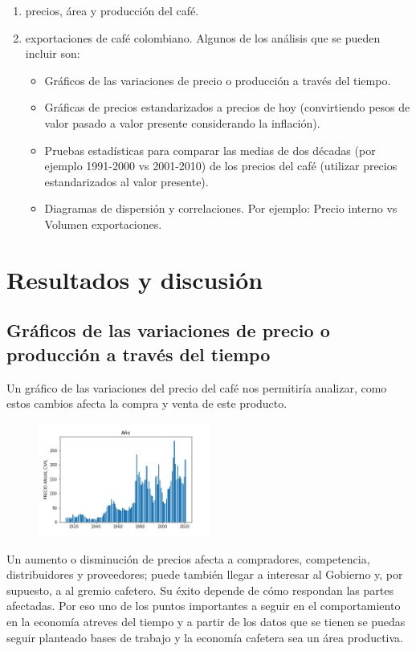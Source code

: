 \documentclass[11pt,letterpaper,twocolumn]{article}
\begin{document}
\begin{enumerate}
    \item  precios,   área y producción del café.
    \item  exportaciones de café colombiano. Algunos de los análisis que se pueden incluir son:
    \begin{itemize}
        \item Gráficos de las variaciones de precio o producción a través del tiempo.
        \item Gráficas de precios estandarizados a precios de hoy (convirtiendo pesos de valor pasado a valor presente considerando la inflación).
        \item Pruebas estadísticas para comparar las medias de dos décadas (por ejemplo 1991-2000 vs 2001-2010) de los precios del café (utilizar precios estandarizados al valor presente).
        \item Diagramas de dispersión y correlaciones. Por ejemplo: Precio interno vs Volumen exportaciones.
        \end{itemize}
\end{enumerate}


\section{Resultados y discusión}
\justify
\subsection{Gráficos de las variaciones de precio o producción a
través del tiempo}
Un gráfico de las variaciones del precio del café nos permitiría
analizar, como estos cambios afecta la compra y venta de este
producto.
 \begin{figure}[H]
            \centering
            \includegraphics[width=0.5\textwidth]{imagenes/punto2_A.png}
            \caption{\label{fig1:frog}}
        \end{figure}
Un aumento o disminución de precios afecta a compradores,
competencia, distribuidores y proveedores; puede también llegar a
interesar al Gobierno y, por supuesto, a al gremio cafetero. 
Su éxito depende de cómo respondan las partes afectadas. 
Por eso uno de los puntos importantes a seguir en el comportamiento
en la economía atreves del tiempo y a partir de los datos que se
tienen se puedas seguir planteado bases de trabajo y la economía
cafetera sea un área productiva.\\
\end{document}

